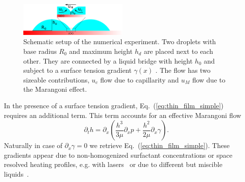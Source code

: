\documentclass[twocolumn,amsmath,amssymb,showpacs,pre,nofootinbib,superscriptaddress]{revtex4-1} %
\begin{document}
\begin{figure}
    \centering
    \includegraphics[width=0.48\textwidth]{Figures/setup.png}
    \caption{Schematic setup of the numerical experiment. 
    Two droplets with base radius $R_0$ and maximum height $h_d$ are placed next to each other. 
    They are connected by a liquid bridge with height $h_0$ and subject to a surface tension gradient $\gamma(x)$ .
    The flow has two sizeable contributions, $u_c$ flow due to capillarity and $u_M$ flow due to the Marangoni effect.
    }
    \label{fig:schematics}
\end{figure}
In the presence of a surface tension gradient, Eq.~(\ref{eq:thin_film_simple}) requires an additional term.
This term accounts for an effective Marangoni flow~\cite{doi:10.1021/la500459v, karpitschka2014sharp, bestehorn20033d, doi:10.1021/la960488a}
\begin{equation}\label{eq:thin_with_marangoni}
    \partial_t h = \partial_x \left(\frac{h^3}{3\mu}\partial_x p + \frac{h^2}{2\mu}\partial_x\gamma\right).
\end{equation}
Naturally in case of $\partial_x\gamma = 0$ we retrieve Eq.~(\ref{eq:thin_film_simple}).
These gradients appear due to non-homogenized surfactant concentrations or space resolved heating profiles, e.g. with lasers~\cite{doi:10.1021/la960488a, NIKOLOV2002325, bruning2018delayed, wedershoven2014infrared} or due to different but miscible liquids~\cite{doi:10.1021/la800630w, karpitschka2014sharp, doi:10.1021/la500459v}. 
\end{document}
